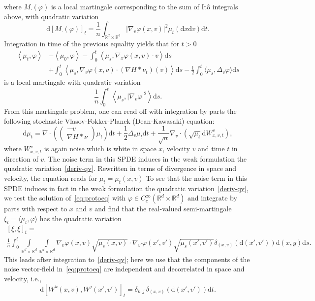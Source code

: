 \documentclass{article}
\newcommand{\dd}{\text{d}}
\newcommand{\R}{\mathbb{R}}
\begin{document}
where $M_\cdot(\varphi)$ is a local martingale corresponding to the sum of It\^o integrals above, with
quadratic variation
\begin{equation*}
  \dd \left[M_\cdot(\varphi)\right]_t =  \frac 1 n \int_{\R^d \times \R^d} \left|\nabla_{v}\varphi(x, v)\right|^2 \mu_t(\dd x \dd v) \dd t.
\end{equation*}
Integration in
time of the previous equality yields that for $t > 0$
\begin{align*}
  \left\langle \mu_t,\varphi\right\rangle & - \left\langle \mu_0, \varphi \right\rangle 
                                      - \int_0^t \left\langle \mu_s, \nabla_x\varphi(x, v)  \cdot v \right\rangle \dd s  \\& +  \int_0^t 
  \left\langle  {\mu_s} , \nabla_v\varphi(x, v) \cdot ( \nabla H \ast \nu_t)(v)\right\rangle \dd s 
  - \frac 1 2 \int_0^t \langle  {\mu_s}, \Delta_{v}\varphi \rangle \dd s 
\end{align*}
is a local martingale with quadratic variation
\begin{equation}    
  \label{deriv-qv}    
  \frac 1 n \int_0^t  \left\langle
    \mu_s, \left|\nabla_{v}\varphi\right|^ 2 \right\rangle 
  \dd s.
\end{equation}
From this martingale problem, one can read off with integration by parts the following stochastic
Vlasov-Fokker-Planck (Dean-Kawasaki) equation:
\begin{equation}
\label{eq:protoeq}    
  \dd \mu_t = \nabla \cdot \left( \begin{pmatrix} -v \\  \nabla H \ast \nu \end{pmatrix} \mu_t\right) \dd t
  + \frac 1 2  \Delta_{v} \mu_t \dd t+ \frac 1 {\sqrt{n}}\nabla_v \cdot\left(\sqrt{\mu_t}\dd W_{x,v,t}^v\right),
\end{equation}
where $W_{x, v,t}^v$ is again noise which is white in space $x$, velocity $v$ and time $t$ in direction of
$v$. The noise term in this SPDE induces in the weak formulation the quadratic variation~\eqref{deriv-qv}.
Rewritten in terms of divergence in space and velocity, the equation reads for $\mu_t = \mu_t(x,v)$ To see
that the noise term in this SPDE induces in fact in the weak formulation the quadratic
variation~\eqref{deriv-qv}, we test the solution of~\eqref{eq:protoeq} with
$\varphi \in C^\infty_c(\R^d \times \R^d)$ and integrate by parts with respect to $x$ and $v$ and find that
the real-valued semi-martingale $\xi_t= \langle \mu_t, \varphi\rangle$ has the quadratic variation
\begin{multline*}
\left[\xi,\xi\right]_t  = \\\frac 1 n \int _0^t \int\limits_{\R^d \times \R^d}\int\limits_{\R^d \times \R^d}  \nabla_{v} \varphi(x,v)\sqrt{\mu_s(x,v)}\cdot  \nabla_{v'} \varphi(x',v')\sqrt{\mu_s(x',v')} \delta_{(x,v)}(\dd(x',v'))\dd (x,y)\dd s 
. \end{multline*} This leads after integration to~\eqref{deriv-qv}; here we use that the components of the
noise vector-field in~\eqref{eq:protoeq} are independent and decorrelated in space and velocity, i.e.,
\[ \mathrm{d}\left[W^k(x,v),W^j(x',v')\right]_t= \delta_{k,j}\,  \delta_{(x,v)}(\dd(x',v'))\dd t. \]
\end{document}
